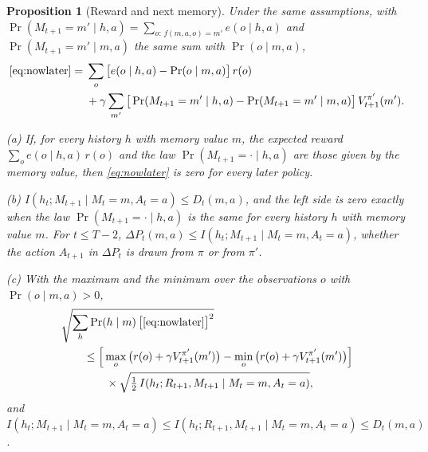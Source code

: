 \documentclass{article}
\newtheorem{proposition}{Proposition}[section]
\theoremstyle{definition}
\newcommand{\dP}{\Delta P}
\begin{document}
\begin{proposition}[Reward and next memory]\label{prop:rewardmemory}
Under the same assumptions, with $\Pr(M_{t+1}=m'\mid h,a)=\sum_{o:\,f(m,a,o)=m'}e(o\mid h,a)$ and $\Pr(M_{t+1}=m'\mid m,a)$ the same sum with $\Pr(o\mid m,a)$,
\begin{align}
\eqref{eq:nowlater}={}&\sum_o\big[e(o\mid h,a)-\Pr(o\mid m,a)\big]\,r(o) \nonumber\\
&+\gamma\sum_{m'}\big[\Pr(M_{t+1}=m'\mid h,a)-\Pr(M_{t+1}=m'\mid m,a)\big]\,V^{\pi'}_{t+1}(m'). \label{eq:rewardmemory}
\end{align}

(a) If, for every history $h$ with memory value $m$, the expected reward $\sum_oe(o\mid h,a)\,r(o)$ and the law $\Pr(M_{t+1}=\cdot\mid h,a)$ are those given by the memory value, then \eqref{eq:nowlater} is zero for every later policy.

(b) $I(h_t;M_{t+1}\mid M_t=m,A_t=a)\le D_t(m,a)$, and the left side is zero exactly when the law $\Pr(M_{t+1}=\cdot\mid h,a)$ is the same for every history $h$ with memory value $m$. For $t\le T-2$, $\dP_t(m,a)\le I(h_t;M_{t+1}\mid M_t=m,A_t=a)$, whether the action $A_{t+1}$ in $\dP_t$ is drawn from $\pi$ or from $\pi'$.

(c) With the maximum and the minimum over the observations $o$ with $\Pr(o\mid m,a)>0$,
\begin{align*}
&\sqrt{\sum_h\Pr(h\mid m)\,\big[\eqref{eq:nowlater}\big]^2}\\
&\qquad\le\Big[\max_o\big(r(o)+\gamma V^{\pi'}_{t+1}(m')\big)-\min_o\big(r(o)+\gamma V^{\pi'}_{t+1}(m')\big)\Big]\\
&\qquad\qquad\times\sqrt{\tfrac12\,I(h_t;R_{t+1},M_{t+1}\mid M_t=m,A_t=a)},
\end{align*}
and $I(h_t;M_{t+1}\mid M_t=m,A_t=a)\le I(h_t;R_{t+1},M_{t+1}\mid M_t=m,A_t=a)\le D_t(m,a)$.
\end{proposition}
\end{document}
